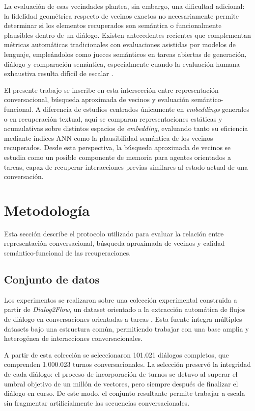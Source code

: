 \documentclass[runningheads]{llncs}
\begin{document}
La evaluación de esas vecindades plantea, sin embargo, una dificultad adicional: la fidelidad geométrica respecto de vecinos exactos no necesariamente permite determinar si los elementos recuperados son semántica o funcionalmente plausibles dentro de un diálogo. Existen antecedentes recientes que complementan métricas automáticas tradicionales con evaluaciones asistidas por modelos de lenguaje, empleándolos como jueces semánticos en tareas abiertas de generación, diálogo y comparación semántica, especialmente cuando la evaluación humana exhaustiva resulta difícil de escalar \cite{liu2023geval,zheng2023judging}.

El presente trabajo se inscribe en esta intersección entre representación conversacional, búsqueda aproximada de vecinos y evaluación semántico-funcional. A diferencia de estudios centrados únicamente en \textit{embeddings} generales o en recuperación textual, aquí se comparan representaciones estáticas y acumulativas sobre distintos espacios de \textit{embedding}, evaluando tanto su eficiencia mediante índices ANN como la plausibilidad semántica de los vecinos recuperados. Desde esta perspectiva, la búsqueda aproximada de vecinos se estudia como un posible componente de memoria para agentes orientados a tareas, capaz de recuperar interacciones previas similares al estado actual de una conversación.

\section{Metodología}
\label{sec:methodology}

Esta sección describe el protocolo utilizado para evaluar la relación entre representación conversacional, búsqueda aproximada de vecinos y calidad semántico-funcional de las recuperaciones.

\subsection{Conjunto de datos}

Los experimentos se realizaron sobre una colección experimental construida a partir de \textit{Dialog2Flow}, un dataset orientado a la extracción automática de flujos de diálogo en conversaciones orientadas a tareas \cite{burdisso2024dialog2flow}. Esta fuente integra múltiples datasets bajo una estructura común, permitiendo trabajar con una base amplia y heterogénea de interacciones conversacionales.

A partir de esta colección se seleccionaron 101.021 diálogos completos, que comprenden 1.000.023 turnos conversacionales. La selección preservó la integridad de cada diálogo: el proceso de incorporación de turnos se detuvo al superar el umbral objetivo de un millón de vectores, pero siempre después de finalizar el diálogo en curso. De este modo, el conjunto resultante permite trabajar a escala sin fragmentar artificialmente las secuencias conversacionales.
\end{document}
